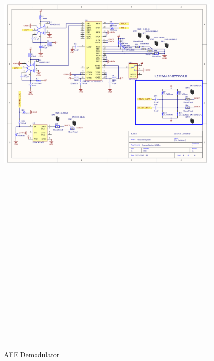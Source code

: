 \begin{landscape}
	\begin{figure}[htbp]
		\centering
		\includegraphics[width=20cm,height=28.7cm,keepaspectratio]{Figures/appendix/afe_altium/5_demodulator.pdf}
		\caption{AFE Demodulator}
		\label{fig:appendix_5_demodulator}
	\end{figure}
\end{landscape}
